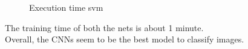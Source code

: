 \documentclass{article}
\begin{document}
\begin{figure}[H]  \label{cnn} 
  \begin{adjustwidth}{-4cm}{-4cm}
     \centering
     \caption{Execution time svm}
      \end{adjustwidth}
   \end{figure}
\noindent The training time of both the nets is about 1 minute.\\
Overall, the CNNs seem to be the best model to classify images.
\end{document}
